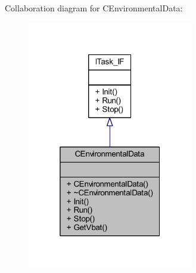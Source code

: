 Collaboration diagram for C\+Environmental\+Data\+:\nopagebreak
\begin{figure}[H]
\begin{center}
\leavevmode
\includegraphics[width=205pt]{class_c_environmental_data__coll__graph}
\end{center}
\end{figure}
